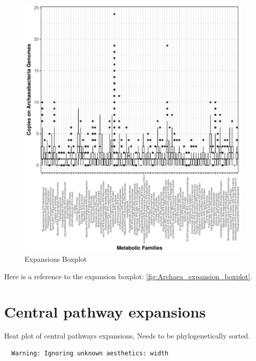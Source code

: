 \documentclass[12pt,twoside]{reedthesis}
\begin{document}
  \begin{figure}[h!tbp]
  \centering
  \includegraphics[angle = 0,scale = 1]{chapter3/expansion_plotArchaeas.pdf}
  \caption[Expansions Boxplot]{\normalsize{Expansions Boxplot}}
  \label{fig:Archaea_expansion_boxplot}
  \end{figure}
  
  Here is a reference to the expansion boxplot:
  \autoref{fig:Archaea_expansion_boxplot}.\\
  \clearpage 
  
  \section{Central pathway expansions}\label{central-pathway-expansions}
  
  Heat plot of central pathways expansions, Needs to be phylogenetically
  sorted.
  
  \begin{verbatim}
  Warning: Ignoring unknown aesthetics: width
  \end{verbatim}
  
\end{document}
